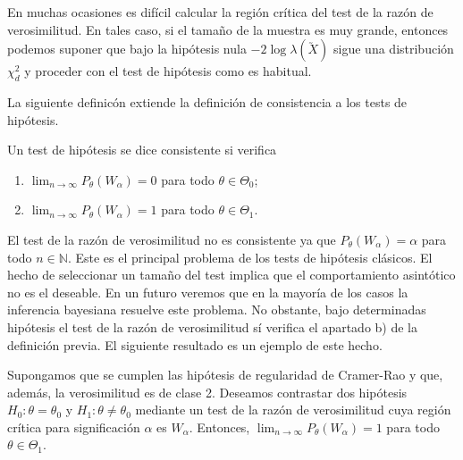         En muchas ocasiones es difícil calcular la región crítica del test de la razón de verosimilitud. En tales caso, si el tamaño de la muestra es muy grande, entonces podemos suponer que bajo la hipótesis nula $-2 \log \lambda(\utilde{X})$ sigue una distribución $\chi_d^2$ y proceder con el test de hipótesis como es habitual.

        La siguiente definicón extiende la definición de consistencia a los tests de hipótesis.

        \begin{definition}
            Un test de hipótesis se dice consistente si verifica
            \begin{enumerate}
                \item $\lim_{n \to \infty} P_{\theta}(W_\alpha) = 0$ para todo $\theta \in \Theta_0$;
                \item $\lim_{n \to \infty} P_{\theta}(W_\alpha) = 1$ para todo $\theta \in \Theta_1$.
            \end{enumerate}
        \end{definition}

        El test de la razón de verosimilitud no es consistente ya que $P_{\theta}(W_\alpha) = \alpha$ para todo $n \in \mathbb{N}$. Este es el principal problema de los tests de hipótesis clásicos. El hecho de seleccionar un tamaño del test implica que el comportamiento asintótico no es el deseable. En un futuro veremos que en la mayoría de los casos la inferencia bayesiana resuelve este problema. No obstante, bajo determinadas hipótesis el test de la razón de verosimilitud sí verifica el apartado b) de la definición previa. El siguiente resultado es un ejemplo de este hecho.

        \begin{prop}
            Supongamos que se cumplen las hipótesis de regularidad de Cramer-Rao y que, además, la verosimilitud es de clase 2. Deseamos contrastar dos hipótesis $H_0: \theta = \theta_0$ y $H_1: \theta \ne \theta_0$ mediante un test de la razón de verosimilitud cuya región crítica para significación $\alpha$ es $W_\alpha$. Entonces, $\lim_{n \to \infty} P_{\theta}(W_\alpha) = 1$ para todo $\theta \in \Theta_1$.
        \end{prop}

